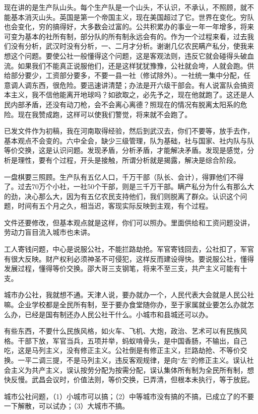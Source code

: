 现在讲的是生产队山头。每个生产队是一个山头，不认识，不承认，不照顾，就不能基本消灭山头。英国是第一个帝国主义，现在美国超过了它。世界在变化。穷队也会变化，穷的搞得好，大多数会过富的。公共积累办的事业一年一年增多，将来可变为基本的社所有制，部分队的所有制永远会有的。作为一个过程来看，过去我们没有分析，武汉时没有分析，一、二月才分析。谢谢几亿农民瞒产私分，使我来想这个问题。要使公社一般懂得这个问题，这是客观法则，违反它就会碰得头破血流。如果我们不能真正说服他们，还是这样犹犹豫豫，公社就会垮，人就会跑。供给部分要少，工资部分要多，不要一县一社（修试除外）。一社统一集中分配，任意调人调东西，很危险。要迅速讲清楚；办法是开六级干部会。有人说富队会搞资本主义，我不信他能离开地球吗？如欲取之，必先予之，现在他就跑了。这还是人民内部矛盾，还没有动刀枪，会不会离心离德？照现在的情况有脱离太阳系的危险。现在我赞成跑，这样可以使我们警觉，将来就不会跑了。

已发文件作为初稿，我在河南取得经验，然后到武汉去，你们不要等，放手去作，基本观点不会变的。六中全会，缺少三级管理，队为基础，社与国家、社内队与队等价交换，这是认识问题。发现矛盾，分析矛盾，才能解决矛盾。发现是感觉，分析是理性，要有个过程，开头是接触，所谓分析就是揭露，解决是综合阶段。

一盘棋要三照顾。生产队有五亿人口，千万干部（队长、会计），得罪他们不得了。过去70万个小社，一社50个干部，则是三千万干部。瞒产私分为什么有那么大的劲，决心那么大，因为有五亿农民支持他们，我们则脱离了群众。认识这个问题，时间有五个月之久，相当迟，客现实际反映到主观，有个过程。

文件还要修改，但基本观点就是这样，你们可以照办。里面供给和工资问题没讲，劳动力盲目流入城市也未讲。

工人寄钱问题，中心是说服公社，不能拦路劫抢。军官寄钱回去，公社扣了，军官有很大反映。财产权利必须神圣不可侵犯，这样反而建设得快。要说服公社，懂得发展过程，懂得等价交换。邵大哥三支钢笔，将来不至三支，共产主义可能有十支。

城市办公社，我就想不通。天津人说，要办就办一个，人民代表大会就是人民公社嘛。企业学校都是全民所有制，至于要办食堂随你办，至于家属就业要怎么办就怎么办，已经是国有制还办人民公社干什么。小城市和县城还可以办。

有些东西，不要什么民族风格，如火车、飞机、大炮，政治、艺术可以有民族风格。干部下放，军官当兵，五项并举，蚂蚁啃骨头，是中国香肠，不输出，自己吃，这是马列主义，没有修正主义。公社倒是有修正主义，拦路劫抢、不等价交换。一平二调三提，不是马列主义，违反客观规律，是向“左”的修正主义。误认社会主义为共产主义，误认按劳分配为按需分配，误认集体所有制为全民所有制，想快反慢。武昌会议时，价值法则，等价交换，已弄清，但根本未执行，等于放屁。

城市公社问题，（1）小城市可以搞；（2）中等城市没有搞的不搞，已成立了的不要一下解散，可以试办；（3）大城市不搞。


